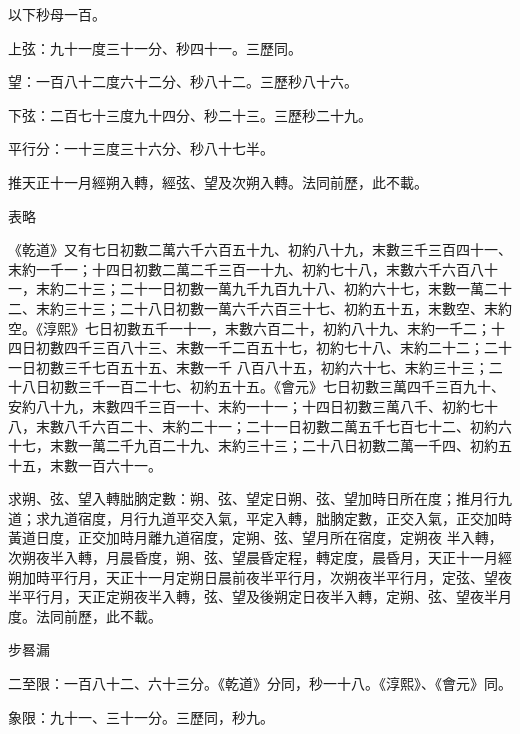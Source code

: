\begin{pinyinscope}
 以下秒母一百。



 上弦：九十一度三十一分、秒四十一。三歷同。



 望：一百八十二度六十二分、秒八十二。三歷秒八十六。



 下弦：二百七十三度九十四分、秒二十三。三歷秒二十九。



 平行分：一十三度三十六分、秒八十七半。



 推天正十一月經朔入轉，經弦、望及次朔入轉。法同前歷，此不載。



 表略



 《乾道》又有七日初數二萬六千六百五十九、初約八十九，末數三千三百四十一、末約一千一；十四日初數二萬二千三百一十九、初約七十八，末數六千六百八十一，末約二十三；二十一日初數一萬九千九百九十八、初約六十七，末數一萬二十二、末約三十三；二十八日初數一萬六千六百三十七、初約五十五，末數空、末約空。《淳熙》七日初數五千一十一，末數六百二十，初約八十九、末約一千二；十四日初數四千三百八十三、末數一千二百五十七，初約七十八、末約二十二；二十一日初數三千七百五十五、末數一千
 八百八十五，初約六十七、末約三十三；二十八日初數三千一百二十七、初約五十五。《會元》七日初數三萬四千三百九十、安約八十九，末數四千三百一十、末約一十一；十四日初數三萬八千、初約七十八，末數八千六百二十、末約二十一；二十一日初數二萬五千七百七十二、初約六十七，末數一萬二千九百二十九、末約三十三；二十八日初數二萬一千四、初約五十五，末數一百六十一。



 求朔、弦、望入轉朏朒定數：朔、弦、望定日朔、弦、望加時日所在度；推月行九道；求九道宿度，月行九道平交入氣，平定入轉，朏朒定數，正交入氣，正交加時黃道日度，正交加時月離九道宿度，定朔、弦、望月所在宿度，定朔夜
 半入轉，次朔夜半入轉，月晨昏度，朔、弦、望晨昏定程，轉定度，晨昏月，天正十一月經朔加時平行月，天正十一月定朔日晨前夜半平行月，次朔夜半平行月，定弦、望夜半平行月，天正定朔夜半入轉，弦、望及後朔定日夜半入轉，定朔、弦、望夜半月度。法同前歷，此不載。



 步晷漏



 二至限：一百八十二、六十三分。《乾道》分同，秒一十八。《淳熙》、《會元》同。



 象限：九十一、三十一分。三歷同，秒九。




\end{pinyinscope}
